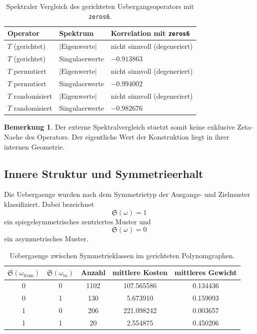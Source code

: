 \documentclass[11pt,a4paper]{article}
\theoremstyle{definition}
\newtheorem{bemerkung}[satz]{Bemerkung}
\begin{document}
\begin{table}[H]
\centering
\begin{tabular}{lll}
\toprule
Operator & Spektrum & Korrelation mit \texttt{zeros6} \\
\midrule
\(T\) (gerichtet) & \(|\mathrm{Eigenwerte}|\) & nicht sinnvoll (degeneriert) \\
\(T\) (gerichtet) & Singulaerwerte & \(-0.913863\) \\
\(T\) permutiert & \(|\mathrm{Eigenwerte}|\) & nicht sinnvoll (degeneriert) \\
\(T\) permutiert & Singulaerwerte & \(-0.994002\) \\
\(T\) randomisiert & \(|\mathrm{Eigenwerte}|\) & nicht sinnvoll (degeneriert) \\
\(T\) randomisiert & Singulaerwerte & \(-0.982676\) \\
\bottomrule
\end{tabular}
\caption{Spektraler Vergleich des gerichteten Uebergangsoperators mit \texttt{zeros6}.}
\end{table}

\begin{bemerkung}
Der externe Spektralvergleich stuetzt somit keine exklusive Zeta-Naehe des Operators. Der eigentliche Wert der Konstruktion liegt in ihrer internen Geometrie.
\end{bemerkung}

\subsection{Innere Struktur und Symmetrieerhalt}

Die Uebergaenge wurden nach dem Symmetrietyp der Ausgangs- und Zielmuster klassifiziert. Dabei bezeichnet
\[
\mathfrak S(\omega)=1
\]
ein spiegelsymmetrisches zentriertes Muster und
\[
\mathfrak S(\omega)=0
\]
ein asymmetrisches Muster.

\begin{table}[H]
\centering
\begin{tabular}{ccccc}
\toprule
\(\mathfrak S(\omega_{\mathrm{from}})\) & \(\mathfrak S(\omega_{\mathrm{to}})\) & Anzahl & mittlere Kosten & mittleres Gewicht \\
\midrule
0 & 0 & 1102 & 107.565586 & 0.134436 \\
0 & 1 & 130  & 5.673910   & 0.159093 \\
1 & 0 & 206  & 221.098242 & 0.003657 \\
1 & 1 & 20   & 2.554875   & 0.450206 \\
\bottomrule
\end{tabular}
\caption{Uebergaenge zwischen Symmetrieklassen im gerichteten Polynomgraphen.}
\end{table}
\end{document}
